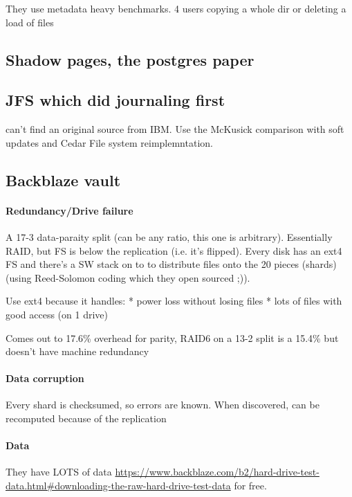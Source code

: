\documentclass[a4paper]{report}
\begin{document}
        They use metadata heavy benchmarks. 4 users copying a whole dir or
        deleting a load of files
    \subsection{Shadow pages, the postgres paper}

    \subsection{JFS which did journaling first}

        can't find an original source from IBM. Use the McKusick comparison
        with soft updates and Cedar File system reimplemntation.

    \subsection{Backblaze vault}
        \paragraph{Redundancy/Drive failure}

        A 17-3 data-paraity split (can be any ratio, this one is arbitrary).
        Essentially RAID, but FS is below the replication (i.e. it's flipped).
        Every disk has an ext4 FS and there's a SW stack on to to distribute
        files onto the 20 pieces (shards) (using Reed-Solomon coding which they
        open sourced ;)).

        Use ext4 because it handles:
        * power loss without losing files
        * lots of files with good access (on 1 drive)

        Comes out to 17.6\% overhead for parity, RAID6 on a 13-2 split is a
        15.4\% but doesn't have machine redundancy

        \paragraph{Data corruption}

        Every shard is checksumed, so errors are known. When discovered, can be
        recomputed because of the replication

        \paragraph{Data}
        They have LOTS of data
        \url{https://www.backblaze.com/b2/hard-drive-test-data.html#downloading-the-raw-hard-drive-test-data}
        for free.
\end{document}
